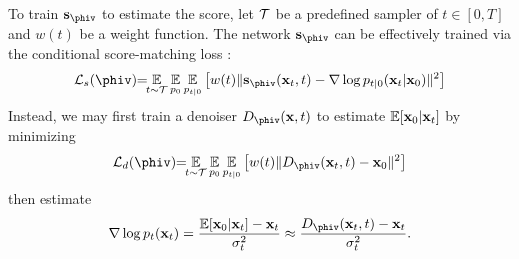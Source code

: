 To train $\sv_{\phiv}$ to estimate the score, let $\mathcal{T}$ be a predefined sampler of $t \in [0, T]$ and $w(t)$ be a weight function. The network $\sv_{\phiv}$ can be effectively trained via the conditional score-matching loss \citep{SongDCKKEP2021}:
\begin{align*}
	\Lc_s(\phiv) \hspace{-0.3em} = \hspace{-0.4em} \underset{t \sim \Tc}{\Eb}\, \underset{p_0}{\Eb} \,  \underset{p_{t|0}}{\Eb} \left[w(t) \|\sv_{\phiv}(\xv_t, t) - \nabla \log p_{t\vert 0}(\xv_t \vert \xv_0)\|^2 \right]  %
\end{align*}
Instead, we may first train a denoiser $D_{\phiv}(\xv, t)$ to estimate $\mathbb{E}[\mathbf{x}_0 \vert \mathbf{x}_t]$ by minimizing \citep{KarrasAAL22}
\begin{align}
	\Lc_d(\phiv) \hspace{-0.3em} = \hspace{-0.4em} \underset{t \sim \Tc}{\Eb}\, \underset{p_0}{\Eb} \,  \underset{p_{t|0}}{\Eb} \left[w(t) \|D_{\phiv}(\xv_t, t) - \xv_0 \|^2 \right] \label{eq:denoiser_loss}
\end{align}
then estimate 
\begin{align}
	\nabla \log p_t(\xv_t) = \frac{\Eb[\xv_0 \vert \xv_t] - \xv_t}{\sigma_t^2} \approx \frac{D_{\phiv}(\xv_t, t) - \xv_t}{\sigma_t^2}. \label{eq:score_repara_in_denoiser}
\end{align}

 


%
%
%
%
%
%
%
%
%

